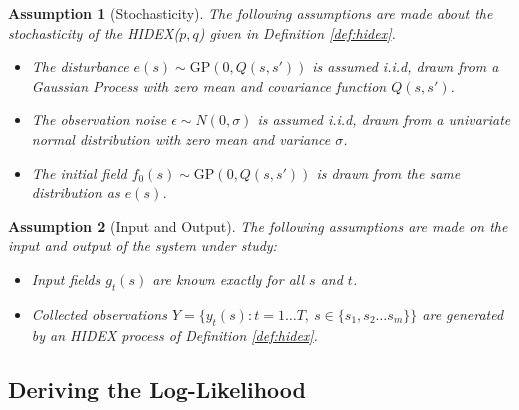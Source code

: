 \documentclass{IEEEtran}
\newtheorem{assumption}{Assumption}
\begin{document}
\begin{assumption}[Stochasticity]
	\label{ass:noise}
	The following assumptions are made about the stochasticity of the HIDEX($p,q$) given in Definition \ref{def:hidex}.
	\begin{itemize}
		\item The disturbance $e(s) \sim \mathrm{GP}(0,Q(s,s'))$ is assumed i.i.d, drawn from a Gaussian Process with zero mean and covariance function $Q(s,s')$.
		\item The observation noise $\epsilon \sim N(0,\sigma)$ is assumed i.i.d, drawn from a univariate normal distribution with zero mean and variance $\sigma$.
		\item The initial field $f_0(s) \sim \mathrm{GP}(0,Q(s,s'))$ is drawn from the same distribution as $e(s)$.
	\end{itemize}
\end{assumption}

\begin{assumption}[Input and Output]
	\label{ass:inout}
The following assumptions are made on the input and output of the system under study:
	\begin{itemize}
		\item Input fields $g_t(s)$ are known exactly for all $s$ and $t$.
		\item Collected observations $Y = \{ y_t(s) : t = 1 \ldots T, ~ s \in \{s_1, s_2 \ldots s_m\} \}$ are generated by an HIDEX process of Definition \ref{def:hidex}.
	\end{itemize}
\end{assumption}

\subsection{Deriving the Log-Likelihood}
\end{document}
